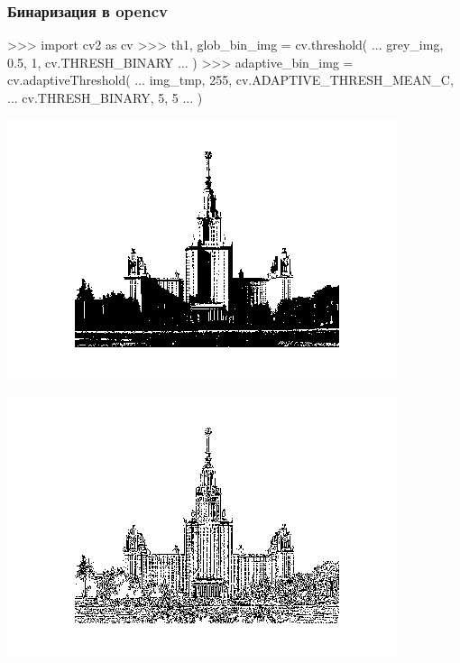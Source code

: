 \documentclass[fleqn, xcolor=x11names]{beamer}
\begin{document}
\begin{frame}[fragile]\frametitle{Бинаризация в opencv}
\begin{pcode}
    >>> import cv2 as cv
    >>> th1, glob_bin_img = cv.threshold(
    ...     grey_img, 0.5, 1, cv.THRESH_BINARY
    ... )
    >>> adaptive_bin_img = cv.adaptiveThreshold(
    ...     img_tmp, 255, cv.ADAPTIVE_THRESH_MEAN_C,
    ...     cv.THRESH_BINARY, 5, 5
    ... )
\end{pcode}

\begin{minipage}{0.49\linewidth}
    \includegraphics[scale=0.35]{images/img_global_binarization}
\end{minipage}
\begin{minipage}{0.49\linewidth}
    \includegraphics[scale=0.35]{images/img_adaptive_binarization}
\end{minipage}
\end{frame}
\end{document}
